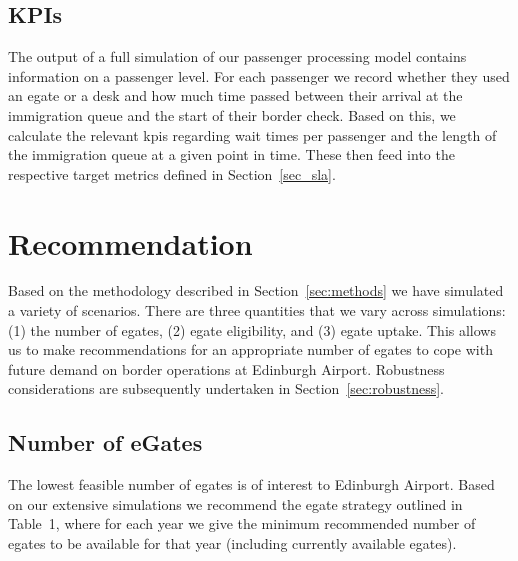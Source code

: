 \documentclass[10pt]{article}
\begin{document}
\subsection{KPIs}
The output of a full simulation of our passenger processing model contains information on a passenger level. For each passenger we record whether they used an \gls{egate} or a desk and how much time passed between their arrival at the immigration queue and the start of their border check. Based on this, we calculate the relevant \glspl{kpi} regarding wait times per passenger and the length of the immigration queue at a given point in time. These then feed into the respective target metrics defined in Section~\ref{sec_sla}.

\section{Recommendation}

Based on the methodology described in Section~\ref{sec:methods} we have simulated a variety of scenarios. There are three quantities that we vary across simulations: (1) the number of \glspl{egate}, (2) \gls{egate} eligibility, and (3) \gls{egate} uptake. This allows us to make recommendations for an appropriate number of \glspl{egate} to cope with future demand on border operations at Edinburgh Airport. Robustness considerations are subsequently undertaken in Section~\ref{sec:robustness}. 

\subsection{Number of eGates} \label{sec:rec_num_egates}

The lowest feasible number of \glspl{egate} is of interest to Edinburgh Airport. Based on our extensive simulations we recommend the \gls{egate} strategy outlined in Table~1, where for each year we give the minimum recommended number of \glspl{egate} to be available for that year (including currently available \glspl{egate}). 

\vspace{2mm}
\begin{center}

\end{center}
\vspace{1mm}
% 
\end{document}
